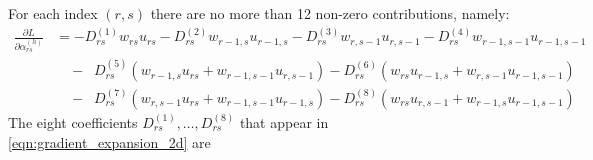 \documentclass[11pt]{article}
\begin{document}
For each index $(r,s)$ there are no more than 12 non-zero contributions, namely:
\begin{equation}
    \begin{aligned}
    \frac{\partial L}{\partial\alpha^{(h)}_{rs}}
    &= -D^{(1)}_{rs} w_{rs}u_{rs}
    - D^{(2)}_{rs} w_{r-1,s} u_{r-1,s}
    - D^{(3)}_{rs} w_{r,s-1} u_{r,s-1}
    - D^{(4)}_{rs} w_{r-1,s-1} u_{r-1,s-1}\\
    &\quad-\;\;D^{(5)}_{rs} (w_{r-1,s} u_{rs} +  w_{r-1,s-1} u_{r,s-1})
    - D^{(6)}_{rs} (w_{rs}u_{r-1,s} + w_{r,s-1}u_{r-1,s-1})\\
    &\quad-\;\; D^{(7)}_{rs} (w_{r,s-1} u_{rs} +  w_{r-1,s-1} u_{r-1,s})
    - D^{(8)}_{rs} (w_{rs} u_{r,s-1} + w_{r-1,s} u_{r-1,s-1})
    \end{aligned}\label{eqn:gradient_expansion_2d}
\end{equation}
The eight coefficients $D^{(1)}_{rs}, \dots, D^{(8)}_{rs}$ that appear in \eqref{eqn:gradient_expansion_2d} are
\end{document}
